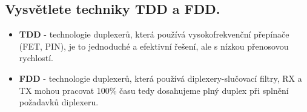 \documentclass[a4paper]{article}
\begin{document}
\subsection{\textbf{Vysvětlete techniky TDD a FDD.}}
\begin{itemize}
	\item \textbf{TDD} - technologie duplexerů, která používá vysokofrekvenční přepínače (FET, PIN), je to jednoduché a efektivní řešení, ale s nízkou přenosovou rychlostí.
	\item \textbf{FDD} - technologie duplexerů, která používá diplexery-slučovací filtry, RX a TX mohou pracovat 100\% času tedy dosahujeme plný duplex při splnění požadavků diplexeru.
\end{itemize}
\end{document}
